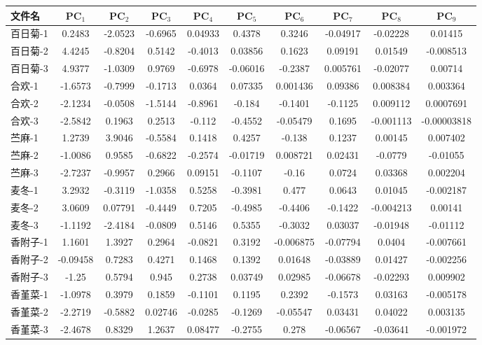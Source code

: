 \documentclass[10.5pt]{config}
\begin{document}
\begin{tabular}{l *{9}{c}}
\hline
\rowcolor{blue!20}
文件名 & PC$_1$ & PC$_2$ & PC$_3$ & PC$_4$ & PC$_5$ & PC$_6$ & PC$_7$ & PC$_8$ & PC$_9$ \\
\hline
百日菊-1 & 0.2483 & -2.0523 & -0.6965 & 0.04933 & 0.4378 & 0.3246 & -0.04917 & -0.02228 & 0.01415 \\
百日菊-2 & 4.4245 & -0.8204 & 0.5142 & -0.4013 & 0.03856 & 0.1623 & 0.09191 & 0.01549 & -0.008513 \\
百日菊-3 & 4.9377 & -1.0309 & 0.9769 & -0.6978 & -0.06016 & -0.2387 & 0.005761 & -0.02077 & 0.00714 \\
合欢-1 & -1.6573 & -0.7999 & -0.1713 & 0.0364 & 0.07335 & 0.001436 & 0.09386 & 0.008384 & 0.003364 \\
合欢-2 & -2.1234 & -0.0508 & -1.5144 & -0.8961 & -0.184 & -0.1401 & -0.1125 & 0.009112 & 0.0007691 \\
合欢-3 & -2.5842 & 0.1963 & 0.2513 & -0.112 & -0.4552 & -0.05479 & 0.1695 & -0.001113 & -0.00003818 \\
苎麻-1 & 1.2739 & 3.9046 & -0.5584 & 0.1418 & 0.4257 & -0.138 & 0.1237 & 0.00145 & 0.007402 \\
苎麻-2 & -1.0086 & 0.9585 & -0.6822 & -0.2574 & -0.01719 & 0.008721 & 0.02431 & -0.0779 & -0.01055 \\
苎麻-3 & -2.7237 & -0.9957 & 0.2966 & 0.09151 & -0.1107 & -0.16 & 0.0724 & 0.03368 & 0.002204 \\
麦冬-1 & 3.2932 & -0.3119 & -1.0358 & 0.5258 & -0.3981 & 0.477 & 0.0643 & 0.01045 & -0.002187 \\
麦冬-2 & 3.0609 & 0.07791 & -0.4449 & 0.7205 & -0.4985 & -0.4406 & -0.1422 & -0.004213 & 0.00141 \\
麦冬-3 & -1.1192 & -2.4184 & -0.0809 & 0.5146 & 0.5355 & -0.3032 & 0.03037 & -0.01948 & -0.01112 \\
香附子-1 & 1.1601 & 1.3927 & 0.2964 & -0.0821 & 0.3192 & -0.006875 & -0.07794 & 0.0404 & -0.007661 \\
香附子-2 & -0.09458 & 0.7283 & 0.4271 & 0.1468 & 0.1392 & 0.01648 & -0.03889 & 0.01427 & -0.002256 \\
香附子-3 & -1.25 & 0.5794 & 0.945 & 0.2738 & 0.03749 & 0.02985 & -0.06678 & -0.02293 & 0.009902 \\
香堇菜-1 & -1.0978 & 0.3979 & 0.1859 & -0.1101 & 0.1195 & 0.2392 & -0.1573 & 0.03163 & -0.005178 \\
香堇菜-2 & -2.2719 & -0.5882 & 0.02746 & -0.0285 & -0.1269 & -0.05547 & 0.03431 & 0.04022 & 0.003135 \\
香堇菜-3 & -2.4678 & 0.8329 & 1.2637 & 0.08477 & -0.2755 & 0.278 & -0.06567 & -0.03641 & -0.001972 \\
\hline
\end{tabular}
\end{document}
